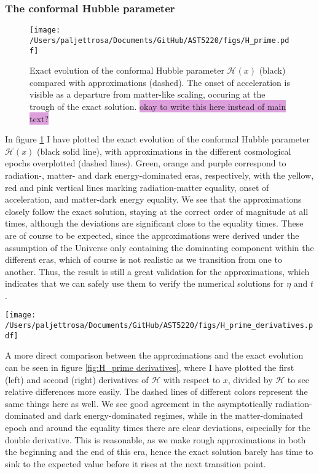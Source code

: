 \documentclass{aa}
\begin{document}
\subsubsection{The conformal Hubble parameter}
\begin{figure}
  \centering
  \texttt{[image: /Users/paljettrosa/Documents/GitHub/AST5220/figs/H\_prime.pdf]}
  \caption{Exact evolution of the conformal Hubble parameter $\mathcal{H}(x)$ (black) compared with approximations (dashed). The onset of acceleration is visible as a departure from matter-like scaling, occuring at the trough of the exact solution. \colorbox{Plum}{okay to write this here instead of main text?}}\label{fig:H_prime}
\end{figure}


In figure \ref{fig:H_prime} I have plotted the exact evolution of the conformal Hubble parameter $\mathcal{H}(x)$ (black solid line), with approximations in the different cosmological epochs overplotted (dashed lines). Green, orange and purple correspond to radiation-, matter- and dark energy-dominated eras, respectively, with the yellow, red and pink vertical lines marking radiation-matter equality, onset of acceleration, and matter-dark energy equality. We see that the approximations closely follow the exact solution, staying at the correct order of magnitude at all times, although the deviations are significant close to the equality times. These are of course to be expected, since the approximations were derived under the assumption of the Universe only containing the dominating component within the different eras, which of course is not realistic as we transition from one to another. Thus, the result is still a great validation for the approximations, which indicates that we can safely use them to verify the numerical solutions for $\eta$ and $t$.

\begin{figure*}
    \centering
    \texttt{[image: /Users/paljettrosa/Documents/GitHub/AST5220/figs/H\_prime\_derivatives.pdf]}
    \caption{Comparison of exact evolutions (black) with approximations (dashed) for the scaled first and second derivatives of $\mathcal{H}(x)$. Agreement is good in pure radiation and matter domination but deviates near transitions due to neglected components.}\label{fig:H_prime derivatives}
\end{figure*}

A more direct comparison between the approximations and the exact evolution can be seen in figure \ref{fig:H_prime derivatives}, where I have plotted the first (left) and second (right) derivatives of $\mathcal{H}$ with respect to $x$, divided by $\mathcal{H}$ to see relative differences more easily. The dashed lines of different colors represent the same things here as well. We see good agreement in the asymptotically radiation-dominated and dark energy-dominated regimes, while in the matter-dominated epoch and around the equality times there are clear deviations, especially for the double derivative. This is reasonable, as we make rough approximations in both the beginning and the end of this era, hence the exact solution barely has time to sink to the expected value before it rises at the next transition point. 
\end{document}
